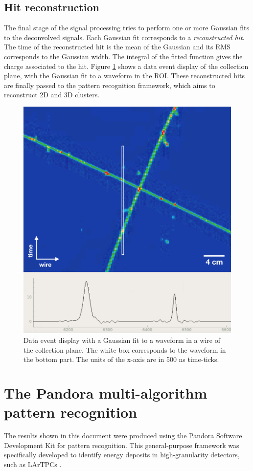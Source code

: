 \subsection{Hit reconstruction}
The final stage of the signal processing tries to perform one or more Gaussian fits to the deconvolved signals. Each Gaussian fit corresponds to a \emph{reconstructed hit}. The time of the reconstructed hit is the mean of the Gaussian and its RMS corresponds to the Gaussian width. The integral of the fitted function gives the charge associated to the hit. Figure \ref{fig:evd_wires} shows a data event display of the collection plane, with the Gaussian fit to a waveform in the ROI. 
These reconstructed hits are finally passed to the pattern recognition framework, which aims to reconstruct 2D and 3D clusters. 

\begin{figure}[htbp]
    \centering
    \includegraphics[width=0.75\linewidth]{figures/evd_wires.png}
    \caption{Data event display with a Gaussian fit to a waveform in a wire of the collection plane. The white box corresponds to the waveform in the bottom part. The units of the x-axis are in 500 ns time-ticks.}
    \label{fig:evd_wires}
\end{figure}

\section{The Pandora multi-algorithm pattern recognition}
The results shown in this document were produced using the Pandora Software Development Kit for pattern recognition. This general-purpose framework was specifically developed to identify energy deposits in high-granularity detectors, such as LArTPCs \cite{Marshall:2015rfa}.

